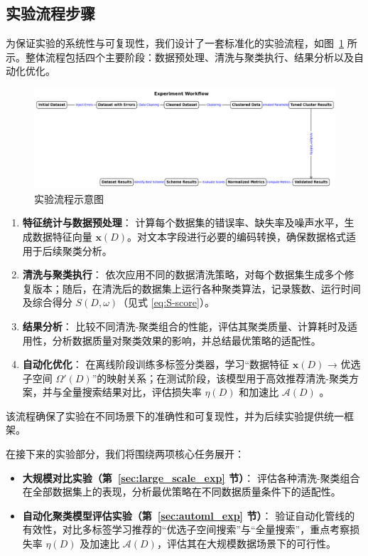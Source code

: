 \documentclass[10pt]{article} %
\numberwithin{equation}{section}
\begin{document}
\vspace{1em}
\subsection{实验流程步骤}
\label{sec:exp_flow}

为保证实验的系统性与可复现性，我们设计了一套标准化的实验流程，如图~\ref{fig:exp_workflow} 所示。整体流程包括四个主要阶段：数据预处理、清洗与聚类执行、结果分析以及自动化优化。

\begin{figure}[htbp]
  \centering
  \includegraphics[width=0.85\linewidth]{exp_workflow.png} %
  \caption{实验流程示意图}
  \label{fig:exp_workflow}
\end{figure}

\begin{enumerate}
    \item \textbf{特征统计与数据预处理}：  
    计算每个数据集的错误率、缺失率及噪声水平，生成数据特征向量 \(\mathbf{x}(D)\)。对文本字段进行必要的编码转换，确保数据格式适用于后续聚类分析。

    \item \textbf{清洗与聚类执行}：  
    依次应用不同的数据清洗策略，对每个数据集生成多个修复版本；随后，在清洗后的数据集上运行各种聚类算法，记录簇数、运行时间及综合得分 \(S(D,\omega)\)（见式 \eqref{eq:S-score}）。

    \item \textbf{结果分析}：  
    比较不同清洗-聚类组合的性能，评估其聚类质量、计算耗时及适用性，分析数据质量对聚类效果的影响，并总结最优策略的适配性。

    \item \textbf{自动化优化}：  
    在离线阶段训练多标签分类器，学习“数据特征 \(\mathbf{x}(D)\) → 优选子空间 \(\Omega'(D)\)”的映射关系；在测试阶段，该模型用于高效推荐清洗-聚类方案，并与全量搜索结果对比，评估损失率 \(\eta(D)\) 和加速比 \(\mathcal{A}(D)\) 。
\end{enumerate}

该流程确保了实验在不同场景下的准确性和可复现性，并为后续实验提供统一框架。

在接下来的实验部分，我们将围绕两项核心任务展开：
\begin{itemize}
    \item \textbf{大规模对比实验（第~\ref{sec:large_scale_exp} 节）}：  
    评估各种清洗-聚类组合在全部数据集上的表现，分析最优策略在不同数据质量条件下的适配性。

    \item \textbf{自动化聚类模型评估实验（第~\ref{sec:automl_exp} 节）}：  
    验证自动化管线的有效性，对比多标签学习推荐的“优选子空间搜索”与“全量搜索”，重点考察损失率 \(\eta(D)\) 及加速比 \(\mathcal{A}(D)\)，评估其在大规模数据场景下的可行性。
\end{itemize}
\end{document}
